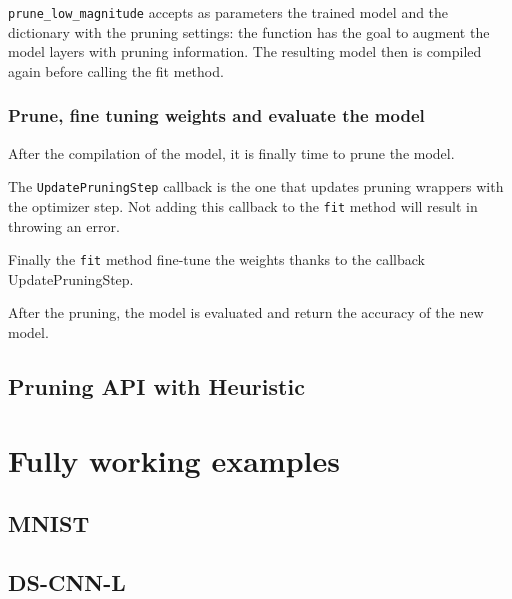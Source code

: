 \texttt{prune\_low\_magnitude} accepts as parameters the trained model and the
dictionary with the pruning settings: the function has the goal to augment the
model layers with pruning information.
The resulting model then is compiled again before calling the fit method.

\subsubsection{Prune, fine tuning weights and evaluate the model}
After the compilation of the model, it is finally time to prune the model.

The \texttt{UpdatePruningStep} callback is the one that updates pruning
wrappers with the optimizer step. Not adding this callback to the \texttt{fit}
method will result in throwing an error.

Finally the \texttt{fit} method fine-tune the weights thanks to the callback
UpdatePruningStep.

After the pruning, the model is evaluated and return the accuracy of the new
model.

\subsection{Pruning API with Heuristic}

\section{Fully working examples}\label{sec:workingexamples}
\lipsum[1]

\subsection{MNIST}
\lipsum[1]

\subsection{DS-CNN-L}
\lipsum[1]
